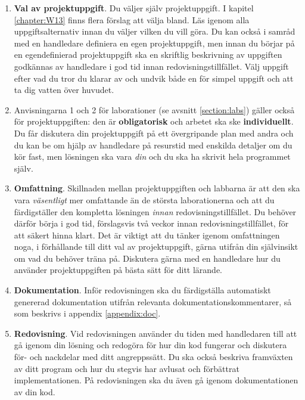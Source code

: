 \begin{enumerate}
\item \textbf{Val av projektuppgift}.
Du väljer själv projektuppgift. I kapitel \ref{chapter:W13} finns flera förslag att välja bland. Läs igenom alla uppgiftsalternativ innan du väljer vilken du vill göra. Du kan också i samråd med en handledare definiera en egen projektuppgift, men innan du börjar på en egendefinierad projektuppgift ska en skriftlig beskrivning av uppgiften godkännas av handledare i god tid innan redovisningstillfället. Välj uppgift efter vad du tror du klarar av och undvik både en för simpel uppgift och att ta dig vatten över huvudet.

\item
Anvisningarna 1 och 2 för laborationer (se avsnitt \ref{section:labs}) gäller också för projektuppgiften: den är \textbf{obligatorisk} och arbetet ska ske \textbf{individuellt}.
Du får diskutera din projektuppgift på ett övergripande plan med andra och du kan be om hjälp av handledare på resurstid med enskilda detaljer om du kör fast, men lösningen ska vara \emph{din} och du ska ha skrivit hela programmet själv.


\item \textbf{Omfattning}.
Skillnaden mellan projektuppgiften och labbarna är att den ska vara \emph{väsentligt} mer omfattande än de största laborationerna och att du färdigställer den kompletta lösningen  \emph{innan} redovisningstillfället. Du behöver därför börja i god tid, förslagsvis två veckor innan redovisningstillfället, för att säkert hinna klart. Det är viktigt att du tänker igenom omfattningen noga, i förhållande till ditt val av projektuppgift, gärna utifrån din självinsikt om vad du behöver träna på. Diskutera gärna med en handledare hur du använder projektuppgiften på bästa sätt för ditt lärande.

\item \textbf{Dokumentation}. Inför redovisningen ska du färdigställa automatiskt genererad dokumentation utifrån relevanta dokumentationskommentarer, så som beskrivs i appendix \ref{appendix:doc}.

\item \textbf{Redovisning}.
Vid redovisningen använder du tiden med handledaren till att gå igenom din lösning och redogöra för hur din kod fungerar och diskutera för- och nackdelar med ditt angreppssätt. Du ska också beskriva framväxten av ditt program och hur du stegvis har avlusat och förbättrat implementationen. På redovisningen ska du även gå igenom dokumentationen av din kod.

\end{enumerate}

